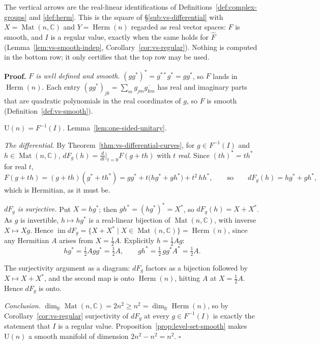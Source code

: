 \documentclass[11pt]{report}
\renewenvironment{proof}[1][Proof]{\noindent\textbf{#1.} }{\hfill$\square$\par\vspace{5pt}}
\newcommand{\Ugp}{\mathrm{U}}
\DeclareMathOperator{\Mat}{Mat}
\DeclareMathOperator{\Herm}{Herm}
\begin{document}
The vertical arrows are the real-linear identifications of Definitions~\ref{def:complex-groups} and \ref{def:herm}. This is the square of \S\ref{sub:vs-differential} with $X = \Mat(n,\mathbb{C})$ and $Y = \Herm(n)$ regarded as real vector spaces: $F$ is smooth, and $I$ is a regular value, exactly when the same holds for $\widehat F$ (Lemma~\ref{lem:vs-smooth-indep}, Corollary~\ref{cor:vs-regular}). Nothing is computed in the bottom row; it only certifies that the top row may be used.


\begin{proof}
\emph{$F$ is well defined and smooth.} $(gg^*)^* = g^{**}g^* = gg^*$, so $F$ lands in $\Herm(n)$. Each entry $(gg^*)_{jk} = \sum_m g_{jm}\overline{g_{km}}$ has real and imaginary parts that are quadratic polynomials in the real coordinates of $g$, so $F$ is smooth (Definition~\ref{def:vs-smooth}).

\emph{$\Ugp(n) = F^{-1}(I)$.} Lemma~\ref{lem:one-sided-unitary}.

\emph{The differential.} By Theorem~\ref{thm:vs-differential-curves}, for $g \in F^{-1}(I)$ and $h \in \Mat(n,\mathbb{C})$, $dF_g(h) = \frac{d}{dt}\big|_{t=0} F(g+th)$ with $t$ \emph{real}. Since $(th)^* = t h^*$ for real $t$,
\[
F(g+th) = (g+th)(g^* + th^*) = gg^* + t\big(hg^* + gh^*\big) + t^2\, hh^*,
\qquad\text{so}\qquad
dF_g(h) = hg^* + gh^* ,
\]
which is Hermitian, as it must be.

\emph{$dF_g$ is surjective.} Put $X = hg^*$; then $gh^* = (hg^*)^* = X^*$, so $dF_g(h) = X + X^*$. As $g$ is invertible, $h \mapsto hg^*$ is a real-linear bijection of $\Mat(n,\mathbb{C})$, with inverse $X \mapsto Xg$. Hence $\operatorname{im} dF_g = \{X + X^* \mid X \in \Mat(n,\mathbb{C})\} = \Herm(n)$, since any Hermitian $A$ arises from $X = \tfrac12 A$. Explicitly $h = \tfrac12 Ag$:
\[
hg^* = \tfrac12 A gg^* = \tfrac12 A, \qquad gh^* = \tfrac12\, g g^* A^* = \tfrac12 A .
\]

\begin{center}
\end{center}

The surjectivity argument as a diagram: $dF_g$ factors as a bijection followed by $X \mapsto X + X^*$, and the second map is onto $\Herm(n)$, hitting $A$ at $X = \tfrac12 A$. Hence $dF_g$ is onto.

\emph{Conclusion.} $\dim_{\mathbb{R}}\Mat(n,\mathbb{C}) = 2n^2 \ge n^2 = \dim_{\mathbb{R}}\Herm(n)$, so by Corollary~\ref{cor:vs-regular} surjectivity of $dF_g$ at every $g \in F^{-1}(I)$ is exactly the statement that $I$ is a regular value. Proposition~\ref{prop:level-set-smooth} makes $\Ugp(n)$ a smooth manifold of dimension $2n^2 - n^2 = n^2$.
\end{proof}
\end{document}
